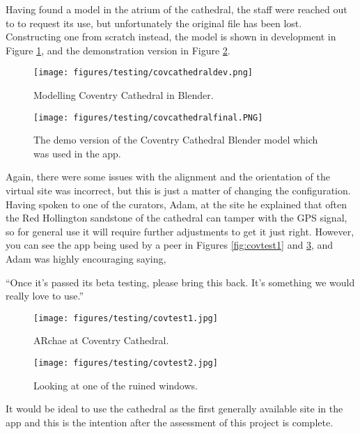 \documentclass[12pt, a4paper]{article}
\begin{document}
Having found a model in the atrium of the cathedral, the staff were reached out to to request its use, but unfortunately the original file has been lost. Constructing one from scratch instead, the model is shown in development in Figure \ref{fig:covdev}, and the demonstration version in Figure \ref{fig:covfinal}.

\begin{figure}
\centering
    \texttt{[image: figures/testing/covcathedraldev.png]}
        \caption{Modelling Coventry Cathedral in Blender.}
        \label{fig:covdev}
\end{figure}

\begin{figure}
\centering
    \texttt{[image: figures/testing/covcathedralfinal.PNG]}
        \caption{The demo version of the Coventry Cathedral Blender model which was used in the app.}
        \label{fig:covfinal}
\end{figure}

Again, there were some issues with the alignment and the orientation of the virtual site was incorrect, but this is just a matter of changing the configuration. Having spoken to one of the curators, Adam, at the site he explained that often the Red Hollington sandstone of the cathedral can tamper with the GPS signal, so for general use it will require further adjustments to get it just right. However, you can see the app being used by a peer in Figures \ref{fig:covtest1} and \ref{fig:covtest2}, and Adam was highly encouraging saying, 

``Once it’s passed its beta testing, please bring this back. It’s something we would really love to use.'' 

\begin{figure}[H]
\centering
\begin{minipage}{.5\textwidth}
  \centering
  \texttt{[image: figures/testing/covtest1.jpg]}
  \caption{ARchae at Coventry Cathedral.}
  \label{fig:covtest1}
\end{minipage}%
\begin{minipage}{.5\textwidth}
  \centering
  \texttt{[image: figures/testing/covtest2.jpg]}
  \caption{Looking at one of the ruined windows.}
  \label{fig:covtest2}
\end{minipage}
\end{figure}

It would be ideal to use the cathedral as the first generally available site in the app and this is the intention after the assessment of this project is complete.
\end{document}
